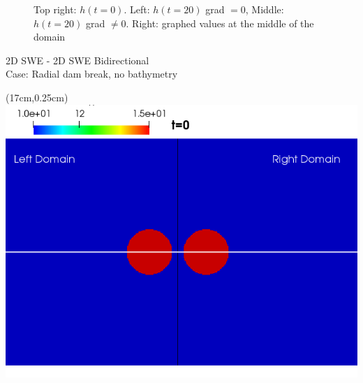 \begin{frame}
\begin{figure}[htp]
\caption{Top right: $h(t=0)$. Left: $h(t=20)$ grad $=0$, Middle: $h(t=20)$ grad $\neq0$. Right: graphed values at the middle of the domain}
\label{fig:figure3}
\end{figure}

\end{frame}

\begin{frame}
\vspace{-0.5cm}
{\large \hspace{3mm} 2D SWE - 2D SWE Bidirectional}\\
Case: Radial dam break, no bathymetry
\begin{textblock*}{5cm}(17cm,0.25cm) %
\includegraphics[scale=0.2]{./Resources/Images/bidirectional0_g_0.png}
\end{textblock*}


\end{frame}
